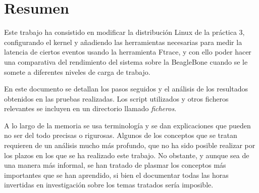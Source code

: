 \documentclass[a4paper,10pt]{article}
\renewcommand{\it}[1]{\textit{#1}}
\begin{document}
\section*{\hfil Resumen \hfil}

Este trabajo ha consistido en modificar la distribución Linux de la práctica 3, configurando el kernel y añadiendo las herramientas necesarias para medir la latencia de ciertos eventos usando la herramienta Ftrace, y con ello poder hacer una comparativa del rendimiento del sistema sobre la BeagleBone cuando se le somete a diferentes niveles de carga de trabajo.

En este documento se detallan los pasos seguidos y el análisis de los resultados obtenidos en las pruebas realizadas. Los script utilizados y otros ficheros relevantes se incluyen en un directorio llamado \it{ficheros}. 

A lo largo de la memoria se usa terminología y se dan explicaciones que pueden no ser del todo precisas o rigurosas. Algunos de los conceptos que se tratan requieren de un análisis mucho más profundo, que no ha sido posible realizar por los plazos en los que se ha realizado este trabajo. No obstante, y aunque sea de una manera más informal, se han tratado de plasmar los conceptos más importantes que se han aprendido, si bien el documentar todas las horas invertidas en investigación sobre los temas tratados sería imposible.

\pagebreak

\begin{spacing}{0.1}
\tableofcontents
\end{spacing}

\pagebreak

\setcounter{page}{1}

\pagestyle{fancy}



\clearpage{}
\newpage



\clearpage{}
\newpage



\clearpage{}
\newpage



\clearpage{}
\newpage



\clearpage{}
\newpage



\clearpage{}
\newpage



\clearpage{}
\newpage

\nocite{*}
\printbibliography
\end{document}
